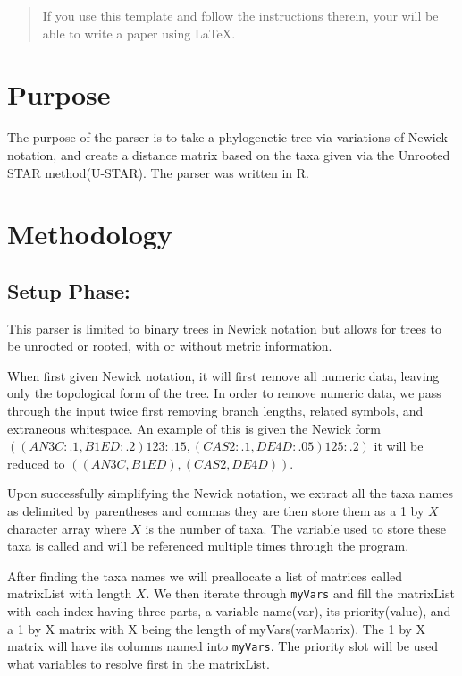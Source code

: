 \documentclass{article}
\begin{document}
\title{}
 
\author{Jesse Zhang}
 

 
\maketitle %
 
\begin{abstract}
If you use this template and follow the instructions therein,
your will be able to write a paper using LaTeX.
\end{abstract}
 
\section{Purpose}

The purpose of the parser is to take a phylogenetic tree via variations of Newick notation, and create a distance matrix based on the taxa given via the Unrooted STAR method(U-STAR). The parser was written in R. 

\section{Methodology}
 
\subsection{Setup Phase:}

This parser is limited to binary trees in Newick notation but allows for trees to be unrooted or rooted, with or without metric information.

When first given Newick notation, it will first remove all numeric data, leaving only the topological form of the tree. In order to remove numeric data, we pass through the input twice first removing branch lengths, related symbols, and extraneous whitespace. An example of this is given the Newick form $((AN3C:.1,B1ED:.2)123:.15,(CAS2:.1,DE4D:.05 )125:.2)$ it will be reduced to $((AN3C,B1ED),(CAS2,DE4D))$. 

Upon successfully simplifying the Newick notation, we extract all the taxa names as delimited by parentheses and commas they are then store them as a 1 by $X$ character array where $X$ is the number of taxa. The variable used to store these taxa is called  and will be referenced multiple times through the program. 

After finding the taxa names we will preallocate a list of matrices called matrixList with length $X$. We then iterate through {\tt myVars} and fill the matrixList with each index having three parts, a variable name(var), its priority(value), and a 1 by X matrix with X being the length of myVars(varMatrix). The 1 by X matrix will have its columns named into {\tt myVars}. The priority slot will be used what variables to resolve first in the matrixList.
\end{document}
